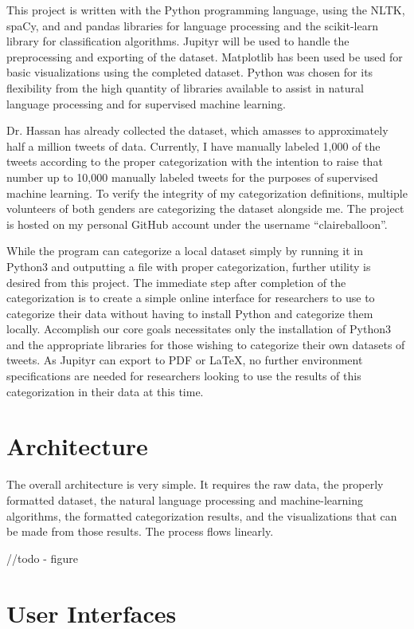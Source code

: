 This project is written with the Python programming language, using the NLTK, spaCy, and and pandas libraries for language processing and the scikit-learn library for classification algorithms. Jupityr will be used to handle the preprocessing and exporting of the dataset. Matplotlib has been used be used for basic visualizations using the completed dataset. Python was chosen for its flexibility from the high quantity of libraries available to assist in natural language processing and for supervised machine learning.


Dr. Hassan has already collected the dataset, which amasses to approximately half a million tweets of data. Currently, I have manually labeled 1,000 of the tweets according to the proper categorization with the intention to raise that number up to 10,000 manually labeled tweets for the purposes of supervised machine learning. To verify the integrity of my categorization definitions, multiple volunteers of both genders are categorizing the dataset alongside me. The project is hosted on my personal GitHub account under the username “claireballoon”.

While the program can categorize a local dataset simply by running it in Python3 and outputting a file with proper categorization, further utility is desired from this project. The immediate step after completion of the categorization is to create a simple online interface for researchers to use to categorize their data without having to install Python and categorize them locally. Accomplish our core goals necessitates only the installation of Python3 and the appropriate libraries for those wishing to categorize their own datasets of tweets. As Jupityr can export to PDF or LaTeX, no further environment specifications are needed for researchers looking to use the results of this categorization in their data at this time.

\section{Architecture}

The overall architecture is very simple. It requires the raw data, the properly formatted dataset, the natural language processing and machine-learning algorithms, the formatted categorization results, and the visualizations that can be made from those results. The process flows linearly.

//todo - figure

\section{User Interfaces}

